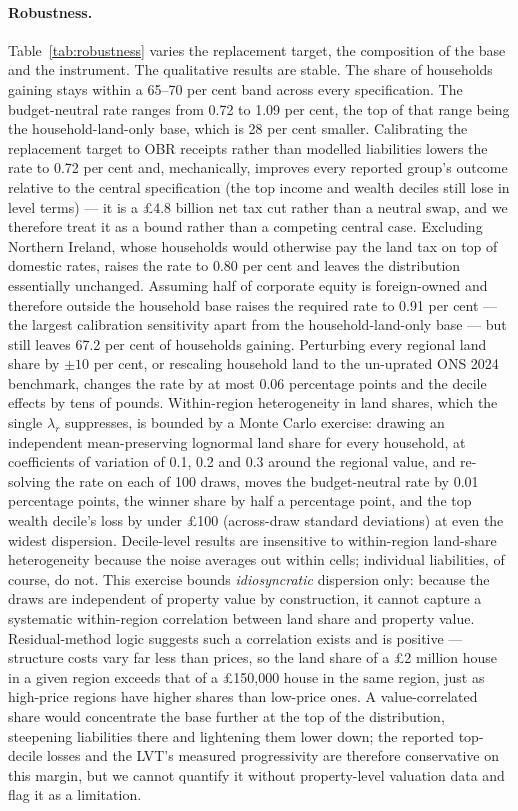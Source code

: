 \paragraph{Robustness.} Table~\ref{tab:robustness} varies the replacement target, the composition of the base and the instrument. The qualitative results are stable. The share of households gaining stays within a 65--70 per cent band across every specification. The budget-neutral rate ranges from 0.72 to 1.09 per cent, the top of that range being the household-land-only base, which is 28 per cent smaller. Calibrating the replacement target to OBR receipts rather than modelled liabilities lowers the rate to 0.72 per cent and, mechanically, improves every reported group's outcome relative to the central specification (the top income and wealth deciles still lose in level terms) --- it is a \pounds 4.8 billion net tax cut rather than a neutral swap, and we therefore treat it as a bound rather than a competing central case. Excluding Northern Ireland, whose households would otherwise pay the land tax on top of domestic rates, raises the rate to 0.80 per cent and leaves the distribution essentially unchanged. Assuming half of corporate equity is foreign-owned and therefore outside the household base raises the required rate to 0.91 per cent --- the largest calibration sensitivity apart from the household-land-only base --- but still leaves 67.2 per cent of households gaining. Perturbing every regional land share by $\pm 10$ per cent, or rescaling household land to the un-uprated ONS 2024 benchmark, changes the rate by at most 0.06 percentage points and the decile effects by tens of pounds. Within-region heterogeneity in land shares, which the single $\lambda_r$ suppresses, is bounded by a Monte Carlo exercise: drawing an independent mean-preserving lognormal land share for every household, at coefficients of variation of 0.1, 0.2 and 0.3 around the regional value, and re-solving the rate on each of 100 draws, moves the budget-neutral rate by 0.01 percentage points, the winner share by half a percentage point, and the top wealth decile's loss by under \pounds 100 (across-draw standard deviations) at even the widest dispersion. Decile-level results are insensitive to within-region land-share heterogeneity because the noise averages out within cells; individual liabilities, of course, do not. This exercise bounds \emph{idiosyncratic} dispersion only: because the draws are independent of property value by construction, it cannot capture a systematic within-region correlation between land share and property value. Residual-method logic suggests such a correlation exists and is positive --- structure costs vary far less than prices, so the land share of a \pounds 2 million house in a given region exceeds that of a \pounds 150{,}000 house in the same region, just as high-price regions have higher shares than low-price ones. A value-correlated share would concentrate the base further at the top of the distribution, steepening liabilities there and lightening them lower down; the reported top-decile losses and the LVT's measured progressivity are therefore conservative on this margin, but we cannot quantify it without property-level valuation data and flag it as a limitation. 